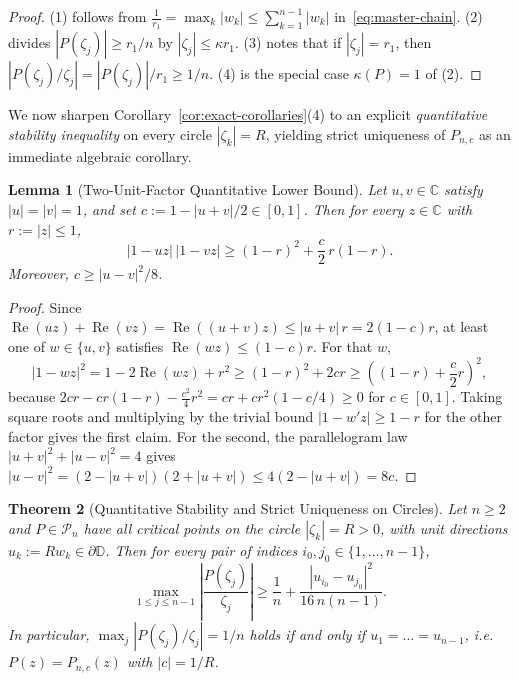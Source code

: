 \documentclass[11pt,a4paper]{article}
\newtheorem{theorem}{Theorem}[section]
\newtheorem{lemma}[theorem]{Lemma}
\theoremstyle{definition}
\theoremstyle{remark}
\newcommand{\CC}{\mathbb{C}}
\newcommand{\DD}{\mathbb{D}}
\DeclareMathOperator{\RePart}{Re}
\begin{document}
\begin{proof}
(1) follows from $\frac{1}{r_1} = \max_k |w_k| \le \sum_{k=1}^{n-1} |w_k|$ in~\eqref{eq:master-chain}. (2) divides $|P(\zeta_j)| \ge r_1/n$ by $|\zeta_j| \le \kappa r_1$. (3) notes that if $|\zeta_j| = r_1$, then $|P(\zeta_j)/\zeta_j| = |P(\zeta_j)|/r_1 \ge 1/n$. (4) is the special case $\kappa(P) = 1$ of (2).
\end{proof}

We now sharpen Corollary~\ref{cor:exact-corollaries}(4) to an explicit \emph{quantitative stability inequality} on every circle $|\zeta_k| = R$, yielding strict uniqueness of $P_{n,c}$ as an immediate algebraic corollary.

\begin{lemma}[Two-Unit-Factor Quantitative Lower Bound]
\label{lem:two-unit}
Let $u, v \in \CC$ satisfy $|u| = |v| = 1$, and set $c := 1 - |u + v|/2 \in [0, 1]$. Then for every $z \in \CC$ with $r := |z| \le 1$,
\[
|1 - u z|\, |1 - v z| \ge (1 - r)^2 + \frac{c}{2}\, r(1 - r).
\]
Moreover, $c \ge |u - v|^2 / 8$.
\end{lemma}

\begin{proof}
Since $\RePart(uz) + \RePart(vz) = \RePart((u + v)z) \le |u + v|\, r = 2(1 - c) r$, at least one of $w \in \{u, v\}$ satisfies $\RePart(wz) \le (1 - c) r$. For that $w$,
\[
|1 - w z|^2 = 1 - 2\RePart(wz) + r^2 \ge (1 - r)^2 + 2 c r \ge \left((1 - r) + \frac{c}{2} r\right)^2,
\]
because $2 c r - c r(1 - r) - \frac{c^2}{4} r^2 = c r + c r^2(1 - c/4) \ge 0$ for $c \in [0, 1]$. Taking square roots and multiplying by the trivial bound $|1 - w' z| \ge 1 - r$ for the other factor gives the first claim. For the second, the parallelogram law $|u + v|^2 + |u - v|^2 = 4$ gives $|u - v|^2 = (2 - |u+v|)(2 + |u+v|) \le 4(2 - |u+v|) = 8c$.
\end{proof}

\begin{theorem}[Quantitative Stability and Strict Uniqueness on Circles]
\label{thm:circle-stability}
Let $n \ge 2$ and $P \in \mathcal{P}_n$ have all critical points on the circle $|\zeta_k| = R > 0$, with unit directions $u_k := R w_k \in \partial\DD$. Then for every pair of indices $i_0, j_0 \in \{1, \dots, n - 1\}$,
\begin{equation}
\label{eq:circle-stability}
\max_{1 \le j \le n-1} \left|\frac{P(\zeta_j)}{\zeta_j}\right| \ge \frac{1}{n} + \frac{|u_{i_0} - u_{j_0}|^2}{16\, n(n - 1)}.
\end{equation}
In particular, $\max_j |P(\zeta_j)/\zeta_j| = 1/n$ holds if and only if $u_1 = \dots = u_{n-1}$, i.e.\ $P(z) = P_{n,c}(z)$ with $|c| = 1/R$.
\end{theorem}
\end{document}
